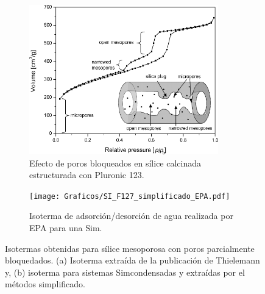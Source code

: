 {			%
			\begin{figure}[th]
		 	   	    \begin{subfigure}[t]{0.49\textwidth}
			       	\includegraphics[width=0.90\textwidth]{Graficos/Doble-distr.png}
			       	\caption{Efecto de poros bloqueados en sílice calcinada estructurada con Pluronic 123.}
			       	\label{fig:thielemann}
			   		\end{subfigure}
			   		\begin{subfigure}[t]{0.49\textwidth}
			   	    \texttt{[image: Graficos/SI\_F127\_simplificado\_EPA.pdf]}
			   	    \caption{Isoterma de adsorción/desorción de agua realizada por EPA para una Sim\pdmF.}
			   		\end{subfigure}
					 \caption{Isotermas obtenidas para sílice mesoporosa con poros parcialmente bloquedados. (a) Isoterma extraída de la publicación de Thielemann\cite{Thielemann2011} y, (b) isoterma para sistemas Sim\pdmF\space condensadas y extraídas por el métodos simplificado.}
					 \label{fig:F127_simplificado_EPA_2}	
				     \end{figure}

}

